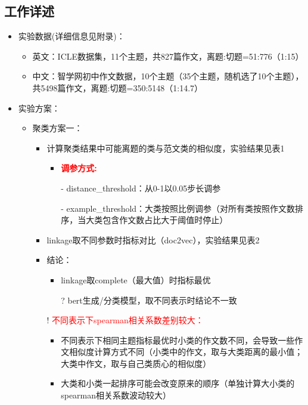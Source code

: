 \documentclass[11pt]{article}
\begin{document}
\begin{CJK}{UTF8}{gkai}
\section{工作详述}
\begin{itemize}
  \item 实验数据(详细信息见附录)：
  \begin{itemize}
    \item 英文：ICLE数据集，11个主题，共827篇作文，离题:切题=51:776（1:15）
    \item 中文：智学网初中作文数据，10个主题（35个主题，随机选了10个主题），共5498篇作文，离题:切题=350:5148（1:14.7）
  \end{itemize}
  \item 实验方案：
  \begin{itemize}
    \item 聚类方案一：
    \begin{itemize}
      \item 计算聚类结果中可能离题的类与范文类的相似度，实验结果见表1
      \begin{itemize}
        \item \textcolor{red}{\textbf{调参方式:}}
        \item [-] distance\_threshold：从0-1以0.05步长调参
        \item [-] example\_threshold：大类按照比例调参（对所有类按照作文数排序，当大类包含作文数占比大于阈值时停止）
      \end{itemize} 
      \item linkage取不同参数时指标对比（doc2vec），实验结果见表2
      \item 结论：
      \begin{itemize}
        \item linkage取complete（最大值）时指标最优
        \item [?] bert生成/分类模型，取不同表示时结论不一致
      \end{itemize}
      \item [!] \textcolor{red}{不同表示下spearman相关系数差别较大：}
      \begin{itemize}
        \item 不同表示下相同主题指标最优时小类的作文数不同，会导致一些作文相似度计算方式不同（小类中的作文，取与大类距离的最小值；大类中作文，取与自己类质心的相似度）
        \item 大类和小类一起排序可能会改变原来的顺序（单独计算大小类的spearman相关系数波动较大）

\end{itemize}
\end{itemize}
\end{itemize}
\end{itemize}
\end{CJK}
\end{document}
